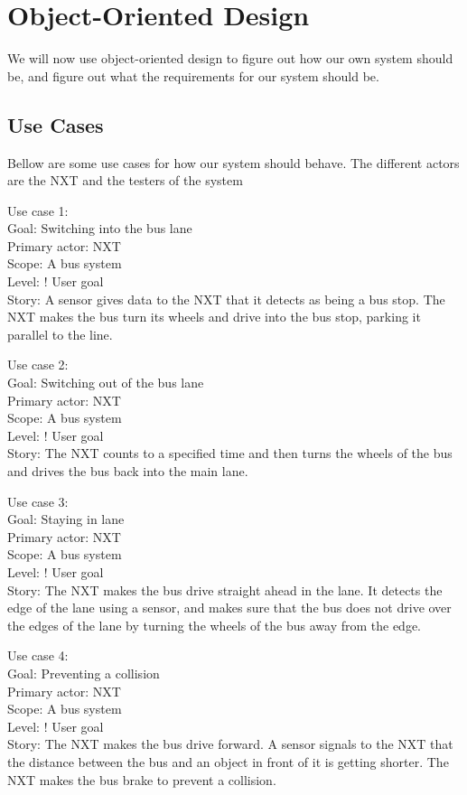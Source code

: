 \section{Object-Oriented Design}

We will now use object-oriented design to figure out how our own system should be, and figure out what the requirements for our system should be.

\subsection{Use Cases}
Bellow are some use cases for how our system should behave. The different actors are the NXT and the testers of the system

Use case 1:\\
Goal: Switching into the bus lane\\
Primary actor: NXT\\
Scope: A bus system\\
Level: ! User goal\\
Story: A sensor gives data to the NXT that it detects as being a bus stop. The NXT makes the bus turn its wheels and drive into the bus stop, parking it parallel to the line.

Use case 2:\\
Goal: Switching out of the bus lane\\
Primary actor: NXT\\
Scope: A bus system\\
Level: ! User goal\\
Story: The NXT counts to a specified time and then turns the wheels of the bus and drives the bus back into the main lane.

Use case 3:\\
Goal: Staying in lane\\
Primary actor: NXT\\
Scope: A bus system\\
Level: ! User goal\\
Story: The NXT makes the bus drive straight ahead in the lane. It detects the edge of the lane using a sensor, and makes sure that the bus does not drive over the edges of the lane by turning the wheels of the bus away from the edge.

Use case 4:\\
Goal: Preventing a collision\\
Primary actor: NXT\\
Scope: A bus system\\
Level: ! User goal\\
Story: The NXT makes the bus drive forward. A sensor signals to the NXT that the distance between the bus and an object in front of it is getting shorter. The NXT makes the bus brake to prevent a collision.

